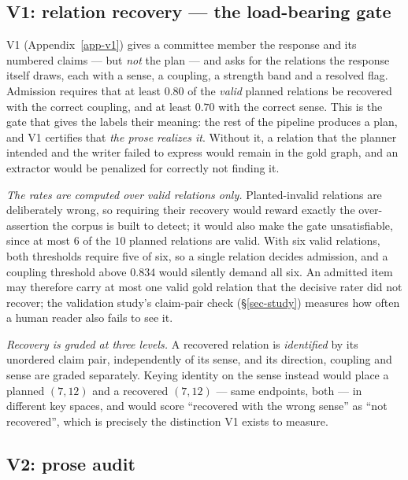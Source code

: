 \subsection{V1: relation recovery --- the load-bearing gate}
\label{sec-v1}

V1 (Appendix~\ref{app-v1}) gives a committee member the response and its numbered claims --- but \emph{not} the
plan --- and asks for the relations the response itself draws, each with a sense, a coupling, a strength band and
a resolved flag. Admission requires that at least $0.80$ of the \emph{valid} planned relations be recovered with
the correct coupling, and at least $0.70$ with the correct sense. This is the gate that gives the labels their
meaning: the rest of the pipeline produces a plan, and V1 certifies that \emph{the prose realizes it}. Without it,
a relation that the planner intended and the writer failed to express would remain in the gold graph, and an
extractor would be penalized for correctly not finding it.

\emph{The rates are computed over valid relations only.} Planted-invalid relations are deliberately wrong, so
requiring their recovery would reward exactly the over-assertion the corpus is built to detect; it would also make
the gate unsatisfiable, since at most $6$ of the $10$ planned relations are valid. With six valid relations, both
thresholds require five of six, so a single relation decides admission, and a coupling threshold above $0.834$
would silently demand all six. An admitted item may therefore carry at most one valid gold relation that the
decisive rater did not recover; the validation study's claim-pair check (\S\ref{sec-study}) measures how often a
human reader also fails to see it.

\emph{Recovery is graded at three levels.} A recovered relation is \emph{identified} by its unordered claim pair,
independently of its sense, and its direction, coupling and sense are graded separately. Keying identity on the
sense instead would place a planned $(7,12)$ and a recovered $(7,12)$ --- same
endpoints, both \con{} --- in different key spaces, and would score ``recovered with the wrong sense'' as ``not
recovered'', which is precisely the distinction V1 exists to measure.

\subsection{V2: prose audit}
\label{sec-v2}

